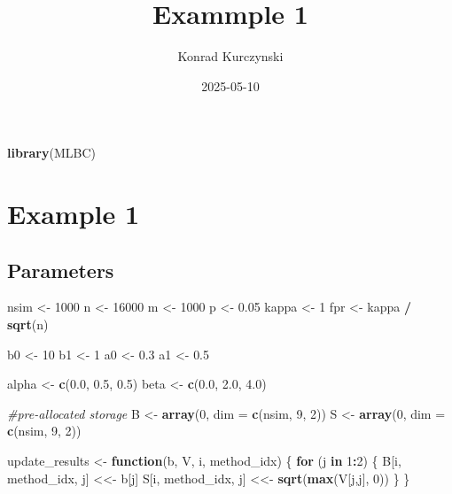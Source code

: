 \documentclass[
]{article}
\title{Exammple 1}
\author{Konrad Kurczynski}
\date{2025-05-10}
\newenvironment{Shaded}{\begin{snugshade}}{\end{snugshade}}
\newcommand{\AttributeTok}[1]{\textcolor[rgb]{0.13,0.29,0.53}{#1}}
\newcommand{\CommentTok}[1]{\textcolor[rgb]{0.56,0.35,0.01}{\textit{#1}}}
\newcommand{\ControlFlowTok}[1]{\textcolor[rgb]{0.13,0.29,0.53}{\textbf{#1}}}
\newcommand{\DecValTok}[1]{\textcolor[rgb]{0.00,0.00,0.81}{#1}}
\newcommand{\FloatTok}[1]{\textcolor[rgb]{0.00,0.00,0.81}{#1}}
\newcommand{\FunctionTok}[1]{\textcolor[rgb]{0.13,0.29,0.53}{\textbf{#1}}}
\newcommand{\NormalTok}[1]{#1}
\newcommand{\OtherTok}[1]{\textcolor[rgb]{0.56,0.35,0.01}{#1}}
\newcommand{\SpecialCharTok}[1]{\textcolor[rgb]{0.81,0.36,0.00}{\textbf{#1}}}
\begin{document}
\maketitle

\begin{Shaded}
\begin{Highlighting}[]
\FunctionTok{library}\NormalTok{(MLBC)}
\end{Highlighting}
\end{Shaded}

\section{Example 1}\label{example-1}

\subsection{Parameters}\label{parameters}

\begin{Shaded}
\begin{Highlighting}[]
\NormalTok{nsim  }\OtherTok{\textless{}{-}} \DecValTok{1000}
\NormalTok{n     }\OtherTok{\textless{}{-}} \DecValTok{16000}
\NormalTok{m     }\OtherTok{\textless{}{-}} \DecValTok{1000}
\NormalTok{p     }\OtherTok{\textless{}{-}} \FloatTok{0.05}
\NormalTok{kappa }\OtherTok{\textless{}{-}} \DecValTok{1}
\NormalTok{fpr   }\OtherTok{\textless{}{-}}\NormalTok{ kappa }\SpecialCharTok{/} \FunctionTok{sqrt}\NormalTok{(n)}

\NormalTok{b0    }\OtherTok{\textless{}{-}} \DecValTok{10}
\NormalTok{b1    }\OtherTok{\textless{}{-}} \DecValTok{1}
\NormalTok{a0    }\OtherTok{\textless{}{-}} \FloatTok{0.3}   
\NormalTok{a1    }\OtherTok{\textless{}{-}} \FloatTok{0.5}   

\NormalTok{alpha }\OtherTok{\textless{}{-}} \FunctionTok{c}\NormalTok{(}\FloatTok{0.0}\NormalTok{, }\FloatTok{0.5}\NormalTok{, }\FloatTok{0.5}\NormalTok{)}
\NormalTok{beta  }\OtherTok{\textless{}{-}} \FunctionTok{c}\NormalTok{(}\FloatTok{0.0}\NormalTok{, }\FloatTok{2.0}\NormalTok{, }\FloatTok{4.0}\NormalTok{)}

\CommentTok{\#pre{-}allocated storage}
\NormalTok{B }\OtherTok{\textless{}{-}} \FunctionTok{array}\NormalTok{(}\DecValTok{0}\NormalTok{, }\AttributeTok{dim =} \FunctionTok{c}\NormalTok{(nsim, }\DecValTok{9}\NormalTok{, }\DecValTok{2}\NormalTok{))}
\NormalTok{S }\OtherTok{\textless{}{-}} \FunctionTok{array}\NormalTok{(}\DecValTok{0}\NormalTok{, }\AttributeTok{dim =} \FunctionTok{c}\NormalTok{(nsim, }\DecValTok{9}\NormalTok{, }\DecValTok{2}\NormalTok{))}

\NormalTok{update\_results }\OtherTok{\textless{}{-}} \ControlFlowTok{function}\NormalTok{(b, V, i, method\_idx) \{}
  \ControlFlowTok{for}\NormalTok{ (j }\ControlFlowTok{in} \DecValTok{1}\SpecialCharTok{:}\DecValTok{2}\NormalTok{) \{}
\NormalTok{    B[i, method\_idx, j] }\OtherTok{\textless{}\textless{}{-}}\NormalTok{ b[j]}
\NormalTok{    S[i, method\_idx, j] }\OtherTok{\textless{}\textless{}{-}} \FunctionTok{sqrt}\NormalTok{(}\FunctionTok{max}\NormalTok{(V[j,j], }\DecValTok{0}\NormalTok{))}
\NormalTok{  \}}
\NormalTok{\}}
\end{Highlighting}
\end{Shaded}
\end{document}

